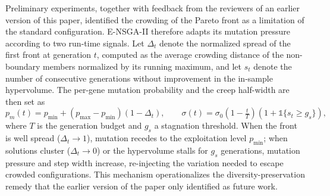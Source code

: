\documentclass[11pt, a4paper]{article}
\begin{document}
Preliminary experiments, together with feedback from the reviewers of an earlier version of this paper, identified the crowding of the Pareto front as a limitation of the standard configuration. E-NSGA-II therefore adapts its mutation pressure according to two run-time signals. Let $\Delta_t$ denote the normalized spread of the first front at generation $t$, computed as the average crowding distance of the non-boundary
members normalized by its running maximum, and let $s_t$ denote the number of consecutive generations without improvement in the in-sample hypervolume. The per-gene mutation probability and the creep half-width are then set as
\begin{equation}
   p_m(t) = p_{\min} + \left(p_{\max}-p_{\min}\right)\left(1-\Delta_t\right),
\qquad
\sigma(t) = \sigma_0 \left(1 - \tfrac{t}{T}\right)\left(1 + \mathds{1}\{s_t \geq g_s\}\right), \tag{4.2.3.1}
\end{equation}
where $T$ is the generation budget and $g_s$ a stagnation threshold. When the front is well spread ($\Delta_t \to 1$), mutation recedes to the exploitation level $p_{\min}$; when solutions cluster ($\Delta_t \to 0$) or the hypervolume stalls for $g_s$ generations,
mutation pressure and step width increase, re-injecting the variation needed to escape crowded configurations. This mechanism operationalizes the diversity-preservation remedy that the earlier version of the paper only identified as future work.
\end{document}
